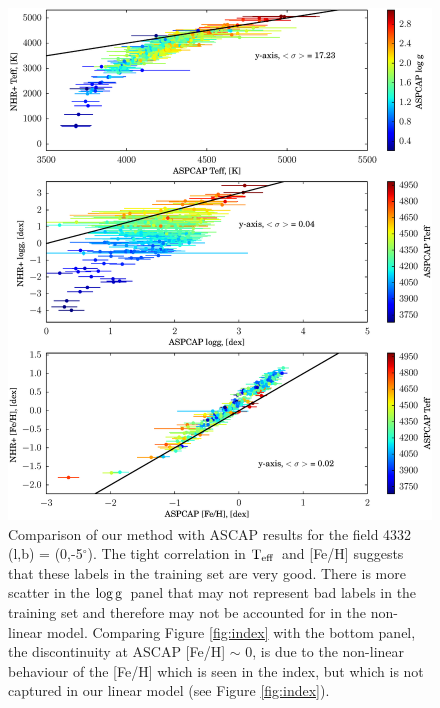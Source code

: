 \documentclass[12pt, preprint]{aastex}
\newcommand{\teff}{\mbox{$\rm T_{eff}$}}
\newcommand{\logg}{\mbox{$\rm \log g$}}
\begin{document}
\begin{figure}[h!]
  \includegraphics[width=\hsize]{./plots/fits_all3.eps}
\caption{\small{Comparison of our method with ASCAP results for the field 4332 (l,b) = (0,-5$^\circ$). The tight correlation in \teff\ and [Fe/H] suggests that these labels in the training set are very good. There is more scatter in the \logg\ panel that may not represent bad labels in the training set and therefore may not be accounted for in the non-linear model. Comparing Figure \ref{fig:index} with the bottom panel, the discontinuity at ASCAP [Fe/H] $\sim$ 0, is due to the non-linear behaviour of the [Fe/H] which is seen in the index, but which is not captured in our linear model (see Figure \ref{fig:index}).}}
\label{fig:cal}
\end{figure}
\end{document}
